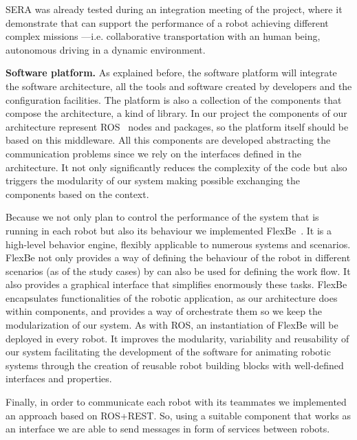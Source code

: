 SERA was already tested during an integration meeting of the project, where it demonstrate that can support the performance of a robot achieving different complex missions ---i.e. collaborative transportation with an human being, autonomous driving in a dynamic environment.


\textbf{Software platform.}
As explained before, the software platform will integrate the software architecture, all the tools and software created by developers and the configuration facilities.
The platform is also a collection of the components that compose the architecture, a kind of library.
In our project the components of our architecture represent ROS~\cite{Quigley2009} nodes and packages, so the platform itself should be based on this middleware.
All this components are developed abstracting the communication problems since we rely on the interfaces defined in the architecture.
It not only significantly reduces the complexity of the code but also triggers the modularity of our system making possible exchanging the components based on the context.

Because we not only plan to control the performance of the system that is running in each robot but also its behaviour we implemented FlexBe~\cite{Schillinger2016}.
It is a high-level behavior engine, flexibly applicable to numerous systems and scenarios.
FlexBe not only provides a way of defining the behaviour of the robot in different scenarios (as of the study cases) by can also be used for defining the work flow.
It also provides a graphical interface that simplifies enormously these tasks.
FlexBe encapsulates functionalities of the robotic application, as our architecture does within components, and provides a way of orchestrate them so we keep the modularization of our system.
As with ROS, an instantiation of FlexBe will be deployed in every robot.
It improves the modularity, variability and reusability of our system facilitating the development of the software for animating robotic systems through the creation of reusable robot building blocks with well-defined interfaces and properties.

Finally, in order to communicate each robot with its teammates we implemented an approach based on ROS+REST.
So, using a suitable component that works as an interface we are able to send messages in form of services between robots.

